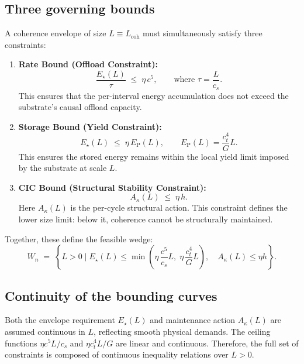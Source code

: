 \documentclass[preprints,article,submit,pdftex,moreauthors]{Definitions/mdpi}
\begin{document}
\subsection[\appendixname~\thesubsection]{Three governing bounds}
A coherence envelope of size \( L \equiv L_{\mathrm{coh}} \) must simultaneously satisfy three constraints:

\begin{enumerate}
  \item \textbf{Rate Bound (Offload Constraint):}
  \begin{equation}
  \frac{E_\star(L)}{\tau} \;\le\; \eta\,c^5, \qquad \text{where } \tau = \frac{L}{c_s}.
  \end{equation}
  This ensures that the per-interval energy accumulation does not exceed the substrate’s causal offload capacity.

  \item \textbf{Storage Bound (Yield Constraint):}
  \begin{equation}
  E_\star(L) \;\le\; \eta\,E_{\mathrm{P}}(L), \qquad E_{\mathrm{P}}(L) = \frac{c_t^4}{G} L.
  \end{equation}
  This ensures the stored energy remains within the local yield limit imposed by the substrate at scale \( L \).

  \item \textbf{CIC Bound (Structural Stability Constraint):}
  \begin{equation}
  A_\kappa(L) \;\le\; \eta\,h.
  \end{equation}
  Here \( A_\kappa(L) \) is the per-cycle structural action. This constraint defines the lower size limit: below it, coherence cannot be structurally maintained.
\end{enumerate}

Together, these define the feasible wedge:
\begin{equation}
W_n \;=\; \left\{ L > 0 \;\bigg|\; 
E_\star(L) \le \min\!\left(\eta\,\frac{c^5}{c_s}L,\; \eta\,\frac{c_t^4}{G}L\right), \quad
A_\kappa(L) \le \eta h \right\}.
\end{equation}

\subsection[\appendixname~\thesubsection]{Continuity of the bounding curves}
Both the envelope requirement \( E_\star(L) \) and maintenance action \( A_\kappa(L) \) are assumed continuous in \( L \), reflecting smooth physical demands. The ceiling functions \( \eta c^5 L / c_s \) and \( \eta c_t^4 L / G \) are linear and continuous. Therefore, the full set of constraints is composed of continuous inequality relations over \( L > 0 \).
\end{document}
